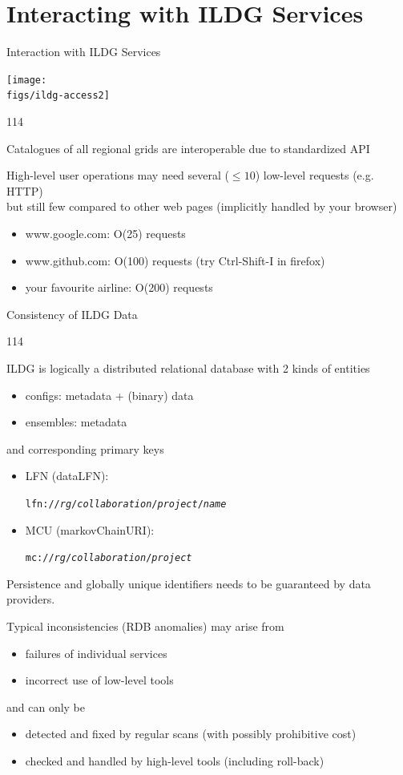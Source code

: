 \documentclass[aspectratio=169,xcolor=dvipsnames]{beamer}
\newcommand{\bi}{\begin{itemize}}
\newcommand{\ei}{\end{itemize}}
\def\figs{figs3}
\begin{document}
\section{Interacting with ILDG Services}
\begin{frame}{Interaction with ILDG Services}

  \begin{center}
    \texttt{[image: \\figs/ildg-access2]}
  \end{center}

  \begin{dinglist}{114}
    \item Catalogues of all regional grids are \alert{interoperable} due to standardized API

    \item  High-level user operations may need several ($\le 10$) low-level requests (e.g. HTTP)\\
      but still few compared to other web pages (implicitly handled by your browser)
      \bi
    \item www.google.com: O(25) requests 
    \item www.github.com: O(100) requests \hspace*{20mm} (try Ctrl-Shift-I in firefox)
    \item your favourite airline: O(200) requests
      \ei
  \end{dinglist}
  \vfill
\end{frame}
\begin{frame}{Consistency of ILDG Data}
  \begin{dinglist}{114}
    \item ILDG is logically a distributed relational database with 2 kinds of entities
      \bi
    \item configs: metadata + (binary) data
    \item ensembles: metadata
    \ei
    and corresponding primary keys
    \bi
    \item \parbox{12em}{LFN (dataLFN):} \alert{\tt lfn://{\it rg}/{\it collaboration}/{\it project}/{\it name}}
    \item \parbox{12em}{MCU (markovChainURI):} \alert{\tt mc://{\it rg}/{\it collaboration}/{\it project}}
    \ei

  \item[\ding{42}] Persistence and globally unique identifiers needs to be guaranteed by data providers.
  
  \item Typical inconsistencies (RDB anomalies) may arise from
  \bi
  \item failures of individual services
  \item incorrect use of low-level tools
  \ei
  and can only be
  \bi
  \item detected and fixed by regular scans (with possibly prohibitive cost)
  \item checked and handled by high-level tools (including roll-back)
  \ei
  \end{dinglist}
  \vfill
\end{frame}
\end{document}
